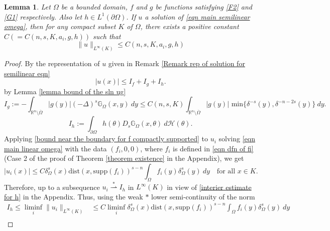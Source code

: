 \documentclass{amsart}
\newtheorem{lemma}[theorem]{Lemma}
\newcommand{\R}{\mathbb{R}}
\newcommand{\slap}{(-\Delta)^{s}}
\newcommand{\gk}[1]{\mathbb{G}_{#1}}
\newcommand{\Ds}{D_{s}}
\begin{document}
\begin{lemma}\label{local uniform bound for semi-linear eqn on bounded domain}
    Let $\Omega$ be a bounded domain, $f$ and $g$ be functions satisfying \ref{F2} and \ref{G1} respectively. Also let $h\in L^{1}(\partial\Omega)$. If $u$ a solution of \eqref{eqn main semilinear omega}, then for any compact subset $K$ of $\Omega$, there exists a positive constant $C(=C(n,s,K,a_{i},g,h))$ such that 
    \begin{equation*}
        \|u\|_{L^{\infty}(K)}\leq C(n,s,K,a_{i},g,h)
    \end{equation*}
\end{lemma}
\begin{proof}
     By the representation of $u$ given in Remark \ref{Remark rep of solution for semilinear eqn}
    \begin{equation*}
        |u(x)|\leq I_{f}+I_{g}+I_{h}.
    \end{equation*}
    by Lemma \ref{lemma bound of the sln ug}
    \begin{equation*}
        I_{g}:=-\int_{\R^{n}\setminus\overline{\Omega}}|g(y)|\slap\gk{\Omega}(x,y)\ dy\leq C(n,s,K)\int_{\R^{n}\setminus\overline{\Omega}}|g(y)| \text{ min}\{\delta^{-s}(y),\delta^{-n-2s}(y)\}\ dy.
    \end{equation*}
    \begin{equation*}
        I_{h}:=\int_{\partial\Omega}h(\theta)\Ds\gk{\Omega}(x,\theta)\ d\mathcal{H}(\theta).
    \end{equation*}
    Applying \eqref{bound near the boundary for f compactly supported} to $u_{i}$ solving \eqref{eqn main linear omega} with the data $(f_{i},0,0)$, where $f_{i}$ is defined in \eqref{eqn dfn of fi} (Case 2 of the proof of Theorem \ref{theorem existence} in the Appendix), we get 
    \begin{equation*}
        |u_{i}(x)|\leq C \delta_{\Omega}^{s}(x)\text{dist}(x,\text{supp}(f_{i}))^{s-n}\int_{\Omega}f_{i}(y)\delta_{\Omega}^{s}(y)\ dy\quad \text{for all }x\in K.
    \end{equation*}
    Therefore, up to a subsequence $u_{i}\overset{*}{\rightharpoonup}I_{h}$ in $L^{\infty}(K)$ in view of \eqref{interier estimate for h} in the Appendix. Thus, using the weak $*$ lower semi-continuity of the norm
    \begin{equation*}
    \begin{split}
        I_{h}\leq \liminf_{i}\|u_{i}\|_{L^{\infty}(K)}&\leq C \liminf_{i}\delta_{\Omega}^{s}(x)\text{dist}(x,\text{supp}(f_{i}))^{s-n}\int_{\Omega}f_{i}(y)\delta_{\Omega}^{s}(y)\ dy\\

\end{split}
\end{equation*}
\end{proof}
\end{document}
